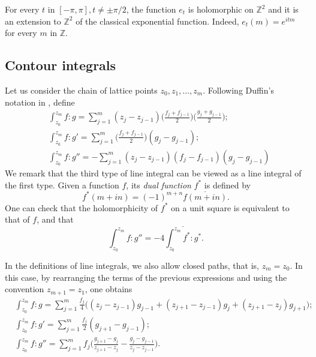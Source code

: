\documentclass[12pt,a4paper,reqno]{amsart}
\theoremstyle{definition}
\theoremstyle{definition}\newtheorem{defn}[thm]{Definition}
\begin{document}
    
    For every $t$ in $[-\pi,\pi], t\neq \pm \pi/2$, the function $e_t$ is holomorphic on $\mathbb{Z}^2$ and it is an extension to $\mathbb Z^2$ of the classical exponential function. Indeed, $e_t(m)=e^{itm}$ for every $m$ in $\mathbb{Z}$.
    
    \subsection{Contour integrals}
    Let us consider the chain of lattice points $z_0,z_1,\ldots,z_m$.  Following Duffin's notation in \cite{D}, define
    \begin{align*}
     &\int_{z_0}^{z_m}f:g=\sum_{j=1}^{m}(z_j-z_{j-1})\Big(\frac{f_j+f_{j-1}}{2}\Big)\Big(\frac{g_j+g_{j-1}}{2}\Big);\\
     &\int_{z_0}^{z_m}f:g'=\sum_{j=1}^{m}\Big(\frac{f_j+f_{j-1}}{2}\Big)(g_{j}-g_{j-1});\\
     & \int_{z_0}^{z_m}f:g''= -\sum_{j=1}^{m}(z_j-z_{j-1})(f_j-f_{j-1})(g_j-g_{j-1})
    \end{align*}
    We remark that the third type of line integral can be viewed as a line integral of the first type. Given a function $f$, its \emph{dual function} $f^*$ is defined by
    \begin{equation}\label{D:dualfunction}    f^\ast(m+in)=(-1)^{m+n}\overline{f(m+in)}.
    \end{equation}
    One can check that the holomorphicity of $f^*$ on a unit square is equivalent to that of $f$, and that
    \[
    \int_{z_0}^{z_m}f:g''=-4\overline{\int_{z_0}^{z_m}f^\ast:g^\ast}.
    \]
    
    In the definitions of line integrals, we also allow closed paths, that is, $z_m=z_0$. In this case, by rearranging the terms of the previous expressions and using the convention $z_{m+1}=z_1$, one obtains 
    \begin{align*}
    &\int_{z_0}^{z_m}f:g=\sum_{j=1}^{m}\frac{f_j}{4}\big((z_j-z_{j-1})g_{j-1}+(z_{j+1}-z_{j-1})g_j+(z_{j+1}-z_j)g_{j+1}\big);\\
     &\int_{z_0}^{z_m}f:g'=\sum_{j=1}^{m}\frac{f_j}{2}(g_{j+1}-g_{j-1});\\
     &\int_{z_0}^{z_m}f:g''=\sum_{j=1}^{m}f_j\bigg(\frac{g_{j+1}-g_{j}}{z_{j+1}-z_{j}}-\frac{g_j-g_{j-1}}{z_j-z_{j-1}}\bigg).
    \end{align*} 
    
\end{document}
